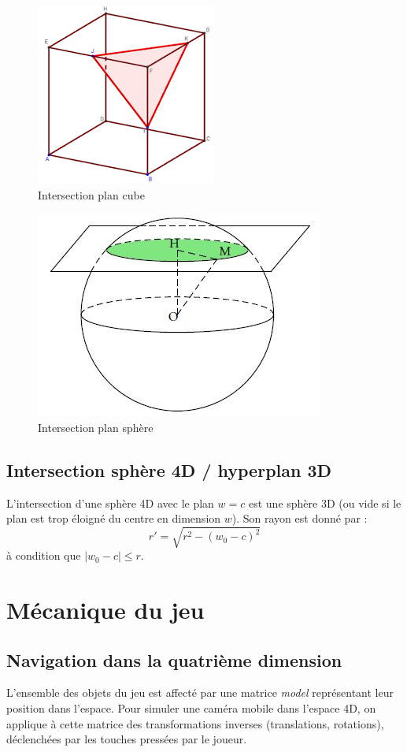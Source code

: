\documentclass[11pt,a4paper]{article}
\begin{document}
\begin{figure}[h]
    \centering
    \includegraphics[width=0.3\linewidth]{intersection-cube}
    \caption{Intersection plan cube}
    \label{fig:inter-plan-cube}
\end{figure}
\begin{figure}
    \centering
    \includegraphics[width=0.3\linewidth]{intersection-sphere}
    \caption{Intersection plan sphère}
    \label{fig:inter-plan-sphere}
\end{figure}

\subsection{Intersection sphère 4D / hyperplan 3D}

L’intersection d’une sphère 4D avec le plan $w = c$ est une sphère 3D (ou vide si le plan est trop éloigné du centre en dimension $w$). Son rayon est donné par :
\[
r' = \sqrt{r^2 - (w_0 - c)^2}
\]
à condition que $|w_0 - c| \leq r$.

\section{Mécanique du jeu}

\subsection{Navigation dans la quatrième dimension}

L’ensemble des objets du jeu est affecté par une matrice \textit{model} représentant leur position dans l’espace. Pour simuler une caméra mobile dans l’espace 4D, on applique à cette matrice des transformations inverses (translations, rotations), déclenchées par les touches pressées par le joueur.
\end{document}
